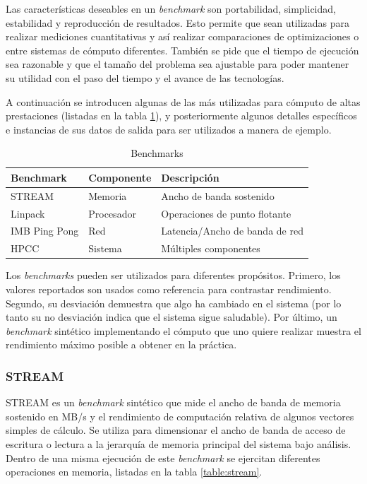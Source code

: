 \documentclass[a4paper]{report}
\begin{document}
\bigskip

Las características deseables en un {\it benchmark} son portabilidad, simplicidad, estabilidad y
reproducción de resultados. Esto permite que sean utilizadas para realizar
mediciones cuantitativas y así realizar comparaciones de optimizaciones o
entre sistemas de cómputo diferentes. También se pide que el tiempo de
ejecución sea razonable y que el tamaño del problema sea ajustable para
poder mantener su utilidad con el paso del tiempo y el avance de las
tecnologías.

\bigskip

A continuación se introducen algunas de las más utilizadas para cómputo
de altas prestaciones (listadas en la tabla \ref{table:benchmark-list}),
y posteriormente algunos detalles específicos e instancias
de sus datos de salida para ser utilizados a manera de ejemplo.

\begin{table}[H]
    \caption{Benchmarks}
    \centering
    \begin{tabular}{|l|l|l|}\hline
      {\bf Benchmark} & {\bf Componente} & {\bf Descripción} \\ \hline
      STREAM & Memoria & Ancho de banda sostenido \\ \hline
      Linpack & Procesador & Operaciones de punto flotante \\ \hline
      IMB Ping Pong & Red & Latencia/Ancho de banda de red \\ \hline
      HPCC & Sistema & Múltiples componentes \\ \hline
        \end{tabular}
  \label{table:benchmark-list}
\end{table}

\bigskip

Los {\it benchmarks} pueden ser utilizados para diferentes propósitos. Primero,
los valores reportados son usados como referencia para contrastar rendimiento.
Segundo, su desviación demuestra que algo ha cambiado en el sistema (por lo tanto
su no desviación indica que el sistema sigue saludable). Por último,
un {\it benchmark} sintético implementando el cómputo que uno quiere realizar
muestra el rendimiento máximo posible a obtener en la práctica.

\subsubsection{STREAM}

STREAM \cite{stream} es un {\it benchmark} sintético que mide el ancho de banda de memoria sostenido en MB/s y el rendimiento de computación relativa de algunos vectores simples de cálculo. Se utiliza para dimensionar el ancho de banda de acceso de escritura o lectura a la jerarquía de memoria principal del sistema bajo análisis. Dentro de una misma ejecución de este {\it benchmark} se ejercitan diferentes operaciones en memoria, listadas en la tabla \ref{table:stream}.
\end{document}
